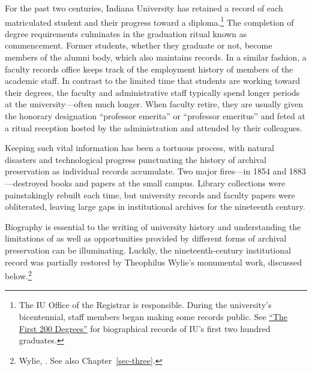 \documentclass[
  american,
  letterpaper,
]{scrreprt}
\begin{document}
For the past two centuries, Indiana University has retained a record of
each matriculated student and their progress toward a
diploma.\footnote{The IU Office of the Registrar is responsible. During
  the university's bicentennial, staff members began making some records
  public. See \href{https://first200.iu.edu/index.html}{``The First 200
  Degrees''} for biographical records of IU's first two hundred
  graduates.} The completion of degree requirements culminates in the
graduation ritual known as commencement. Former students, whether they
graduate or not, become members of the alumni body, which also maintains
records. In a similar fashion, a faculty records office keeps track of
the employment history of members of the academic staff. In contrast to
the limited time that students are working toward their degrees, the
faculty and administrative staff typically spend longer periods at the
university---often much longer. When faculty retire, they are usually
given the honorary designation ``professor emerita'' or ``professor
emeritus'' and feted at a ritual reception hosted by the administration
and attended by their colleagues.

Keeping such vital information has been a tortuous process, with natural
disasters and technological progress punctuating the history of archival
preservation as individual records accumulate. Two major fires---in 1854
and 1883---destroyed books and papers at the small campus. Library
collections were painstakingly rebuilt each time, but university records
and faculty papers were obliterated, leaving large gaps in institutional
archives for the nineteenth century.

Biography is essential to the writing of university history and
understanding the limitations of as well as opportunities provided by
different forms of archival preservation can be illuminating. Luckily,
the nineteenth-century institutional record was partially restored by
Theophilus Wylie's monumental work, discussed below.\footnote{Wylie,
  . See also Chapter~\ref{sec-three}.}
\end{document}
